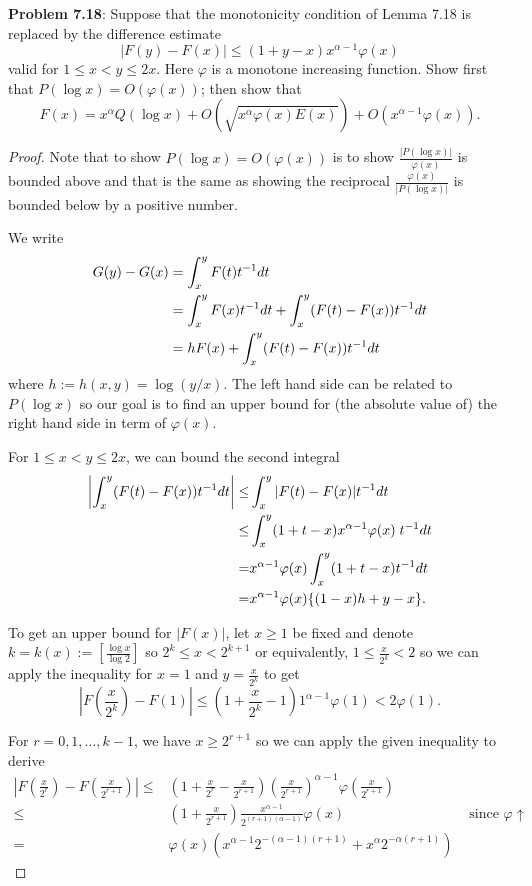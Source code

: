 \documentclass[12pt]{article}
\newcommand{\Abs}[1]{\left| #1 \right|}
\begin{document}
\fi

\textbf{Problem 7.18}: Suppose that the monotonicity condition of Lemma 7.18 is replaced by the difference estimate
$$|F(y) - F(x)| \leq (1 + y - x) x^{\alpha - 1}\varphi(x)$$
valid for $1 \leq x < y \leq 2x$. Here $\varphi$ is a monotone increasing function. Show first that $P(\log x) = O(\varphi(x))$; then show that
$$F(x) = x^\alpha Q(\log x) + O(\sqrt{x^\alpha \varphi(x) E(x)}) + O(x^{\alpha - 1} \varphi(x)).$$

\begin{proof}
Note that to show $P(\log x) = O(\varphi(x))$ is to show $\frac{|P(\log x)|}{\varphi(x)}$ is bounded above and that is the same as showing the reciprocal $\frac{\varphi(x)}{|P(\log x)|}$ is bounded below by a positive number.

We write
\begin{align}
G(y) - G(x) &= \int_x^y F(t) t^{-1} dt \notag\\
&= \int_x^y F(x) t^{-1} dt + \int_x^y (F(t) - F(x)) t^{-1} dt \notag \\
&= h F(x) + \int_x^y (F(t) - F(x)) t^{-1} dt
\label{eq:diffG}
\end{align}
where $h := h(x, y) = \log(y/x)$. The left hand side can be related to $P(\log x)$ so our goal is to find an upper bound for (the absolute value of) the right hand side in term of $\varphi(x)$.

For $1 \leq x < y \leq 2x$, we can bound the second integral
\begin{align}
\Abs{ \int_x^y (F(t) - F(x)) t^{-1} dt }
\leq& \int_x^y |F(t) - F(x)| t^{-1} dt \notag \\
\leq& \int_x^y (1 + t - x) x^{\alpha - 1}\varphi(x) \; t^{-1} dt \notag \\
=& x^{\alpha - 1} \varphi(x) \int_x^y (1 + t - x) t^{-1} dt \notag\\
=& x^{\alpha - 1} \varphi(x) \{ (1 - x) h + y - x \}. \label{ineq:bound_second_integral_Gdiff}
\end{align}

To get an upper bound for $|F(x)|$, let $x \geq 1$ be fixed and denote $k = k(x) := [\frac{\log x}{\log 2}]$ so $2^k \leq x < 2^{k+1}$ or equivalently, $1 \leq \frac{x}{2^k} < 2$ so we can apply the inequality for $x = 1$ and $y = \frac{x}{2^k}$ to get
$$\Abs{F\left(\frac{x}{2^k}\right) - F(1)} \leq \left(1 + \frac{x}{2^k} - 1\right) 1^{\alpha - 1} \varphi(1) < 2 \varphi(1).$$

For $r = 0, 1, ..., k - 1$, we have $x \geq 2^{r+1}$ so we can apply the given inequality to derive
\begin{align*}
\Abs{ F\left(\frac{x}{2^r}\right) - F\left(\frac{x}{2^{r+1}}\right) } \leq& \left(1 + \frac{x}{2^r} - \frac{x}{2^{r+1}}\right) \left(\frac{x}{2^{r+1}}\right)^{\alpha - 1} \varphi\left(\frac{x}{2^{r+1}}\right)\\
\leq& \left(1 + \frac{x}{2^{r+1}}\right) \frac{x^{\alpha - 1}}{2^{(r+1)(\alpha - 1)}} \varphi(x) &\text{ since } \varphi \uparrow\\
=& \varphi(x) (x^{\alpha - 1} 2^{-(\alpha - 1)(r+1)} + x^{\alpha} {2^{-\alpha (r+1)}})
\end{align*}


\end{proof}
\end{document}

